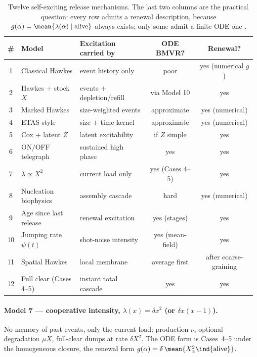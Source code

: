 \begin{table}[htbp]
\centering
\renewcommand{\arraystretch}{1.1}
\small
\begin{tabular}{@{}clp{}cc@{}}
\toprule
\# & Model & Excitation carried by & ODE BMVR? & Renewal? \\
\midrule
1 & Classical Hawkes & event history only & poor & yes (numerical $g$) \\
2 & Hawkes $+$ stock $X$ & events $+$ depletion/refill & via Model 10 & yes \\
3 & Marked Hawkes & size-weighted events & approximate & yes (numerical) \\
4 & ETAS-style & size $+$ time kernel & approximate & yes (numerical) \\
5 & Cox $+$ latent $Z$ & latent excitability & if $Z$ simple & yes \\
6 & ON/OFF telegraph & sustained high phase & yes & yes \\
7 & $\lambda\propto X^2$ & current load only & yes (Cases 4--5) & yes \\
8 & Nucleation biophysics & assembly cascade & hard & yes (numerical) \\
9 & Age since last release & renewal excitation & yes (stages) & yes \\
10 & Jumping rate $\psi(t)$ & shot-noise intensity & yes (mean-field) & yes \\
11 & Spatial Hawkes & local membrane & average first & after coarse-graining \\
12 & Full clear (Cases 4--5) & instant total cascade & yes & yes \\
\bottomrule
\end{tabular}
\caption{Twelve self-exciting release mechanisms. The last two columns are
the practical question: every row admits a renewal description, because
$g(\alpha)=\mean{\lambda(\alpha)\mid\text{alive}}$ always exists; only some
admit a finite ODE one \cite{hawkes1971spectra}.}
\label{p:tab:selfexcite}
\end{table}

\paragraph{Model 7 --- cooperative intensity, $\lambda(x)=\delta x^2$ (or
$\delta x(x-1)$).} No memory of past events, only the current load:
production $\nu$, optional degradation $\mu X$, full-clear dumps at rate
$\delta X^2$. The ODE form is Cases~4--5 under the homogeneous closure, the
renewal form $g(\alpha)=\delta\,\mean{X_\alpha^2\ind\{\text{alive}\}}$.


